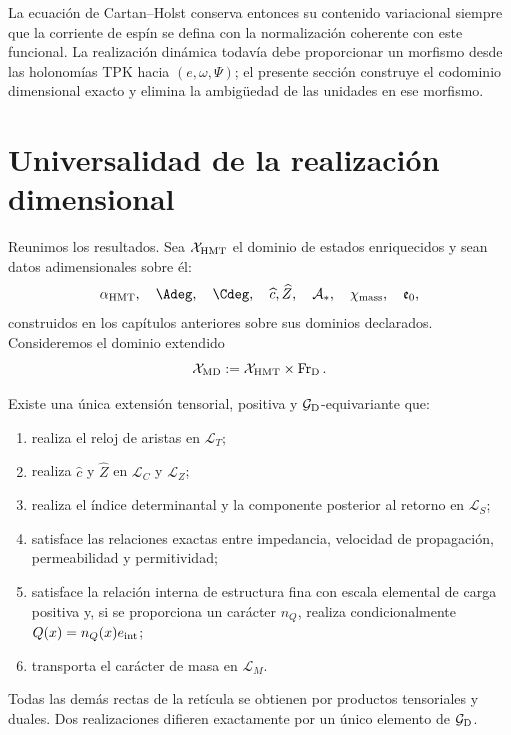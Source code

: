 La ecuación de Cartan--Holst conserva entonces su contenido variacional
siempre que la corriente de espín se defina con la normalización coherente
con este funcional. La realización dinámica todavía debe proporcionar un
morfismo desde las holonomías TPK hacia \((e,\omega,\Psi)\); el presente
sección construye el codominio dimensional exacto y elimina la ambigüedad de
las unidades en ese morfismo.

\section{Universalidad de la realización dimensional}

Reunimos los resultados. Sea \(\mathcal X_{\rm HMT}\) el dominio de estados
enriquecidos y sean datos adimensionales sobre él:
\[
 \alpha_{\rm HMT},\quad \Adeg,\quad\Cdeg,\quad
 \widehat c,\widehat Z,\quad
 \mathcal A_*,\quad\chi_{\rm mass},\quad\mathfrak e_0,
\]
construidos en los capítulos anteriores sobre sus dominios declarados.
Consideremos el dominio extendido
\[
 \mathcal X_{\rm MD}
 :=\mathcal X_{\rm HMT}\times\operatorname{Fr}_{\rm D}.
\]

\begin{theorem}
\label{thm:extension-dimensional-universal}
Existe una única extensión tensorial, positiva y
\(\mathcal G_{\rm D}\)-equivariante que:
\begin{enumerate}
 \item realiza el reloj de aristas en \(\mathcal L_T\);
 \item realiza \(\widehat c\) y \(\widehat Z\) en
       \(\mathcal L_C\) y \(\mathcal L_Z\);
 \item realiza el índice determinantal y la componente posterior al retorno
       en \(\mathcal L_S\);
 \item satisface las relaciones exactas entre impedancia, velocidad de
       propagación, permeabilidad y permitividad;
 \item satisface la relación interna de estructura fina con escala elemental
       de carga positiva y, si se proporciona un carácter \(n_Q\), realiza
       condicionalmente \(Q(x)=n_Q(x)e_{\rm int}\);
 \item transporta el carácter de masa en \(\mathcal L_M\).
\end{enumerate}
Todas las demás rectas de la retícula se obtienen por productos tensoriales y
duales. Dos realizaciones difieren exactamente por un único elemento de
\(\mathcal G_{\rm D}\).
\end{theorem}

